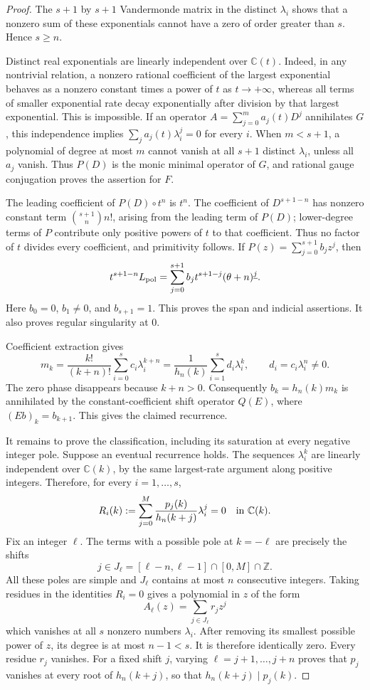 \documentclass[11pt]{article}
\theoremstyle{definition}
\theoremstyle{remark}
\numberwithin{equation}{section}
\begin{document}
\begin{proof}
The $s+1$ by $s+1$ Vandermonde matrix in the distinct $\lambda_i$
shows that a nonzero sum of these exponentials cannot have a zero of
order greater than $s$. Hence $s\ge n$.

Distinct real exponentials are linearly independent over
$\mathbb C(t)$. Indeed, in any nontrivial relation, a nonzero rational
coefficient of the largest exponential behaves as a nonzero constant
times a power of $t$ as $t\to+\infty$, whereas all terms of smaller
exponential rate decay exponentially after division by that largest
exponential. This is impossible. If an operator
$A=\sum_{j=0}^m a_j(t)D^j$ annihilates $G$, this independence implies
$\sum_j a_j(t)\lambda_i^j=0$ for every $i$. When $m<s+1$, a
polynomial of degree at most $m$ cannot vanish at all $s+1$ distinct
$\lambda_i$, unless all $a_j$ vanish. Thus $P(D)$ is the monic
minimal operator of $G$, and rational gauge conjugation proves the
assertion for $F$.

The leading coefficient of $P(D)\circ t^n$ is $t^n$.
The coefficient of $D^{s+1-n}$ has nonzero constant term
$\binom{s+1}{n}n!$, arising from the leading term of $P(D)$;
lower-degree terms of $P$ contribute only positive powers of $t$ to
that coefficient. Thus no factor of $t$ divides every coefficient,
and primitivity follows. If $P(z)=\sum_{j=0}^{s+1}b_jz^j$, then
\[
 t^{s+1-n}L_{\rm pol}
 =\sum_{j=0}^{s+1}b_jt^{s+1-j}
             (\theta+n)^{\underline j}.
\]
Here $b_0=0$, $b_1\ne0$, and $b_{s+1}=1$. This proves the span and
indicial assertions. It also proves regular singularity at $0$.

Coefficient extraction gives
\[
 m_k=\frac{k!}{(k+n)!}\sum_{i=0}^s c_i\lambda_i^{k+n}
     =\frac1{h_n(k)}\sum_{i=1}^s d_i\lambda_i^k,
 \qquad d_i=c_i\lambda_i^n\ne0.
\]
The zero phase disappears because $k+n>0$. Consequently
$b_k=h_n(k)m_k$ is annihilated by the constant-coefficient shift
operator $Q(E)$, where $(Eb)_k=b_{k+1}$. This gives the claimed
recurrence.

It remains to prove the classification, including its saturation at
every negative integer pole. Suppose an eventual recurrence holds.
The sequences $\lambda_i^k$ are linearly independent over
$\mathbb C(k)$, by the same largest-rate argument along positive
integers. Therefore, for every $i=1,\ldots,s$,
\[
 R_i(k):=\sum_{j=0}^M
        \frac{p_j(k)}{h_n(k+j)}\lambda_i^j=0
        \quad\hbox{in }\mathbb C(k).
\]
Fix an integer $\ell$. The terms with a possible pole at $k=-\ell$
are precisely the shifts
\[
 j\in J_\ell=[\ell-n,\ell-1]\cap[0,M]\cap\mathbb Z.
\]
All these poles are simple and $J_\ell$ contains at most $n$
consecutive integers. Taking residues in the identities $R_i=0$
gives a polynomial in $z$ of the form
\[
 A_\ell(z)=\sum_{j\in J_\ell}r_jz^j
\]
which vanishes at all $s$ nonzero numbers $\lambda_i$. After removing
its smallest possible power of $z$, its degree is at most $n-1<s$.
It is therefore identically zero. Every residue $r_j$ vanishes.
For a fixed shift $j$, varying $\ell=j+1,\ldots,j+n$ proves that
$p_j$ vanishes at every root of $h_n(k+j)$, so that
$h_n(k+j)\mid p_j(k)$.


\end{proof}
\end{document}
